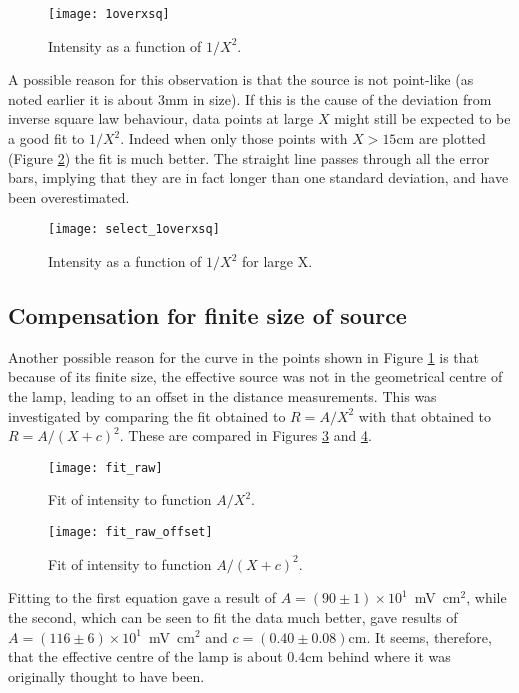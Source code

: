 \documentclass[10pt]{iopart}
\begin{document}
\begin{figure}
  \centering
  \texttt{[image: 1overxsq]}\\
  \caption{Intensity as a function of $1/X^2$.}\label{1overxsq}
\end{figure}

A possible reason for this observation is that the source is not
point-like (as noted earlier it is about $3$mm in size). If this
is the cause of the deviation from inverse square law behaviour,
data points at large $X$ might still be expected to be a good fit
to $1/X^2$. Indeed when only those points with $X>15$cm are
plotted (Figure \ref{select_1overxsq}) the fit is much better. The
straight line passes through all the error bars, implying that
they are in fact longer than one standard deviation, and have been
overestimated.

\begin{figure}
  \centering
  \texttt{[image: select\_1overxsq]}\\
  \caption{Intensity as a function of $1/X^2$  for large X.}\label{select_1overxsq}
\end{figure}

\subsection{Compensation for finite size of source}

Another possible reason for the curve in the points shown in
Figure \ref{1overxsq} is that because of its finite size, the
effective source was not in the geometrical centre of the lamp,
leading to an offset in the distance measurements. This was
investigated by comparing the fit obtained to  $R=A/X^2$ with that
obtained to $R=A/(X+c)^2$. These are compared in Figures
\ref{fit_raw} and \ref{fit_raw_offset}.

\begin{figure}
  \centering
  \texttt{[image: fit\_raw]}\\
  \caption{Fit of intensity to function  $A/X^2$.}\label{fit_raw}
\end{figure}

\begin{figure}
  \centering
  \texttt{[image: fit\_raw\_offset]}\\
  \caption{Fit of intensity to function  $A/(X+c)^2$.}\label{fit_raw_offset}
\end{figure}


Fitting to the first equation gave a result of  $A = (90 \pm
1)\times 10^1$~mV~cm$^2$, while the second, which can be seen to
fit the data much better, gave results of $A  = (116 \pm  6)\times
10^1$~mV~cm$^2$ and $c = (0.40 \pm 0.08)$cm. It seems, therefore,
that the effective centre of the lamp is about $0.4$cm behind
where it was originally thought to have been.
\end{document}
